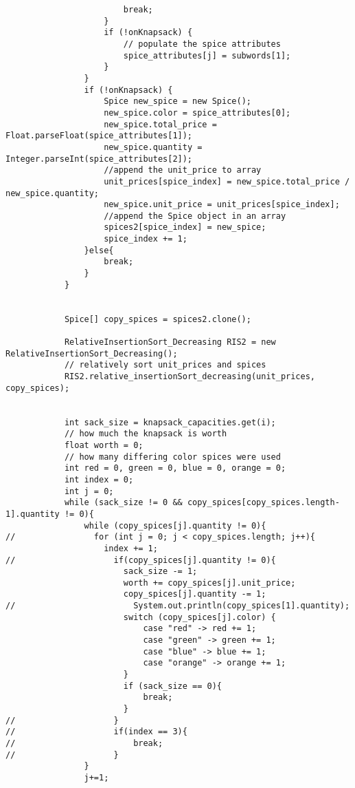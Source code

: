 \documentclass{article}
\begin{document}
\begin{lstlisting}
                        break;
                    }
                    if (!onKnapsack) {
                        // populate the spice attributes
                        spice_attributes[j] = subwords[1];
                    }
                }
                if (!onKnapsack) {
                    Spice new_spice = new Spice();
                    new_spice.color = spice_attributes[0];
                    new_spice.total_price = Float.parseFloat(spice_attributes[1]);
                    new_spice.quantity = Integer.parseInt(spice_attributes[2]);
                    //append the unit_price to array
                    unit_prices[spice_index] = new_spice.total_price / new_spice.quantity;
                    new_spice.unit_price = unit_prices[spice_index];
                    //append the Spice object in an array
                    spices2[spice_index] = new_spice;
                    spice_index += 1;
                }else{
                    break;
                }
            }


            Spice[] copy_spices = spices2.clone();

            RelativeInsertionSort_Decreasing RIS2 = new RelativeInsertionSort_Decreasing();
            // relatively sort unit_prices and spices
            RIS2.relative_insertionSort_decreasing(unit_prices, copy_spices);


            int sack_size = knapsack_capacities.get(i);
            // how much the knapsack is worth
            float worth = 0;
            // how many differing color spices were used
            int red = 0, green = 0, blue = 0, orange = 0;
            int index = 0;
            int j = 0;
            while (sack_size != 0 && copy_spices[copy_spices.length-1].quantity != 0){
                while (copy_spices[j].quantity != 0){
//                for (int j = 0; j < copy_spices.length; j++){
                    index += 1;
//                    if(copy_spices[j].quantity != 0){
                        sack_size -= 1;
                        worth += copy_spices[j].unit_price;
                        copy_spices[j].quantity -= 1;
//                        System.out.println(copy_spices[1].quantity);
                        switch (copy_spices[j].color) {
                            case "red" -> red += 1;
                            case "green" -> green += 1;
                            case "blue" -> blue += 1;
                            case "orange" -> orange += 1;
                        }
                        if (sack_size == 0){
                            break;
                        }
//                    }
//                    if(index == 3){
//                        break;
//                    }
                }
                j+=1;


\end{lstlisting}
\end{document}
